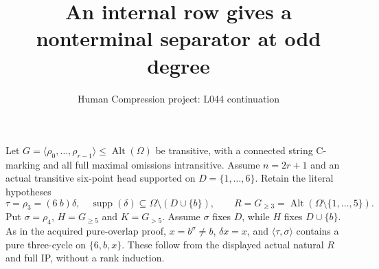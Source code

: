 \documentclass[11pt,a4paper]{article}
\title{An internal row gives a nonterminal separator at odd degree}
\author{Human Compression project: L044 continuation}
\date{}
\newcommand{\gen}[1]{\langle#1\rangle}
\newcommand{\Alt}{\operatorname{Alt}}
\begin{document}
\maketitle
Let $G=\gen{\rho_0,\ldots,\rho_{r-1}}\le\Alt(\Omega)$
be transitive, with a connected string C-marking and all
full maximal omissions intransitive. Assume $n=2r+1$ and
an actual transitive six-point head supported on
$D=\{1,\ldots,6\}$. Retain the literal hypotheses
\[
 \tau=\rho_3=(6\ b)\delta,\quad
 \operatorname{supp}(\delta)\subseteq\Omega\setminus(D\cup\{b\}),
 \qquad R=G_{\ge3}=\Alt(\Omega\setminus\{1,\ldots,5\}).
\]
Put $\sigma=\rho_4$, $H=G_{\ge5}$ and $K=G_{>5}$.
Assume $\sigma$ fixes $D$, while $H$ fixes $D\cup\{b\}$.
As in the acquired pure-overlap proof, $x=b^\sigma\ne b$,
$\delta x=x$, and $\gen{\tau,\sigma}$ contains a pure
three-cycle on $\{6,b,x\}$. These follow from the displayed
actual natural $R$ and full IP, without a rank induction.
\end{document}

